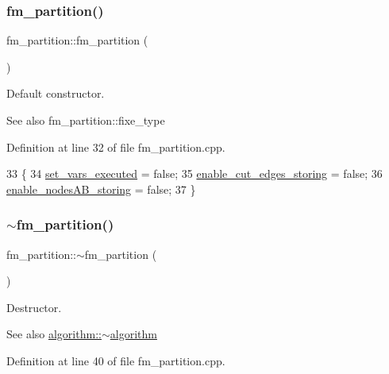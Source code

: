 \subsubsection{\texorpdfstring{fm\+\_\+partition()}{fm\_partition()}}
{\footnotesize\ttfamily fm\+\_\+partition\+::fm\+\_\+partition (\begin{DoxyParamCaption}{ }\end{DoxyParamCaption})}

Default constructor.

\begin{DoxySeeAlso}{See also}
fm\+\_\+partition\+::fixe\+\_\+type 
\end{DoxySeeAlso}


Definition at line 32 of file fm\+\_\+partition.\+cpp.


\begin{DoxyCode}
33 \{
34     \mbox{\hyperlink{classfm__partition_a58edb78c4da479cd790da1eed1a30eab}{set\_vars\_executed}} = \textcolor{keyword}{false};
35     \mbox{\hyperlink{classfm__partition_a806c9f5cb781b8ce662d2a3373433777}{enable\_cut\_edges\_storing}} = \textcolor{keyword}{false};
36     \mbox{\hyperlink{classfm__partition_a2e308857dde9405bc3c6b911218bcda1}{enable\_nodesAB\_storing}} = \textcolor{keyword}{false};
37 \}
\end{DoxyCode}
\mbox{\label{classfm__partition_ab9d4f12de8f65d42240d94f7924fb319}} 
\subsubsection{\texorpdfstring{$\sim$fm\+\_\+partition()}{~fm\_partition()}}
{\footnotesize\ttfamily fm\+\_\+partition\+::$\sim$fm\+\_\+partition (\begin{DoxyParamCaption}{ }\end{DoxyParamCaption})\hspace{0.3cm}{\ttfamily [virtual]}}

Destructor.

\begin{DoxySeeAlso}{See also}
\mbox{\hyperlink{classalgorithm_adca9b1e7fa3afd914519a9dbb44e9fd5}{algorithm\+::$\sim$algorithm}} 
\end{DoxySeeAlso}


Definition at line 40 of file fm\+\_\+partition.\+cpp.



